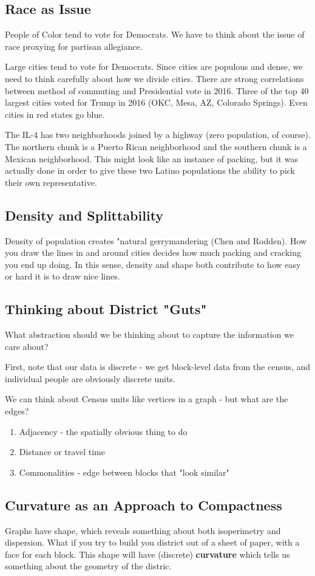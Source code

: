 \subsection*{Race as Issue}

People of Color tend to vote for Democrats. We have to think about the issue of race proxying for partisan allegiance.

 Large cities tend to vote for Democrats.  Since cities are populous and dense, we need to think carefully about how we divide cities.  There are strong correlations between method of commuting and Presidential vote in 2016.  Three of the top 40 largest cities voted for Trump in 2016 (OKC, Mesa, AZ, Colorado Springs).  Even cities in red states go blue.
 
 The IL-4 has two neighborhoods joined by a highway (zero population, of course).  The northern chunk is a Puerto Rican neighborhood and the southern chunk is a Mexican neighborhood.  This might look like an instance of packing, but it was actually done in order to give these two Latino populations the ability to pick their own representative.
 
\subsection*{Density and Splittability}

Density of population creates "natural gerrymandering (Chen and Rodden).  How you draw the lines in and around cities decides how much packing and cracking you end up doing.  In this sense, density and shape both contribute to how easy or hard it is to draw nice lines.


\subsection*{Thinking about District "Guts"}

What abstraction should we be thinking about to capture the information we care about?

First, note that our data is discrete - we get block-level data from the census, and individual people are obviously discrete units.

We can think about Census units like vertices in a graph - but what are the edges?

\begin{enumerate}
	\item[] Adjacency - the spatially obvious thing to do
	\item[] Distance or travel time
	\item[] Commonalities - edge between blocks that "look similar"
\end{enumerate}

\subsection*{Curvature as an Approach to Compactness}

Graphs have shape, which reveals something about both isoperimetry and dispersion.  What if you try to build you district out of a sheet of paper, with a face for each block.  This shape will have (discrete) \textbf{curvature} which tells us something about the geometry of the distric.